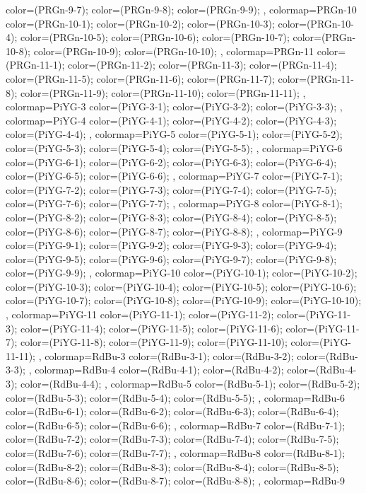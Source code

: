 {{color=(PRGn-9-7);
color=(PRGn-9-8);
color=(PRGn-9-9);
},
colormap={PRGn-10}{
color=(PRGn-10-1);
color=(PRGn-10-2);
color=(PRGn-10-3);
color=(PRGn-10-4);
color=(PRGn-10-5);
color=(PRGn-10-6);
color=(PRGn-10-7);
color=(PRGn-10-8);
color=(PRGn-10-9);
color=(PRGn-10-10);
},
colormap={PRGn-11}{
color=(PRGn-11-1);
color=(PRGn-11-2);
color=(PRGn-11-3);
color=(PRGn-11-4);
color=(PRGn-11-5);
color=(PRGn-11-6);
color=(PRGn-11-7);
color=(PRGn-11-8);
color=(PRGn-11-9);
color=(PRGn-11-10);
color=(PRGn-11-11);
},
colormap={PiYG-3}{
color=(PiYG-3-1);
color=(PiYG-3-2);
color=(PiYG-3-3);
},
colormap={PiYG-4}{
color=(PiYG-4-1);
color=(PiYG-4-2);
color=(PiYG-4-3);
color=(PiYG-4-4);
},
colormap={PiYG-5}{
color=(PiYG-5-1);
color=(PiYG-5-2);
color=(PiYG-5-3);
color=(PiYG-5-4);
color=(PiYG-5-5);
},
colormap={PiYG-6}{
color=(PiYG-6-1);
color=(PiYG-6-2);
color=(PiYG-6-3);
color=(PiYG-6-4);
color=(PiYG-6-5);
color=(PiYG-6-6);
},
colormap={PiYG-7}{
color=(PiYG-7-1);
color=(PiYG-7-2);
color=(PiYG-7-3);
color=(PiYG-7-4);
color=(PiYG-7-5);
color=(PiYG-7-6);
color=(PiYG-7-7);
},
colormap={PiYG-8}{
color=(PiYG-8-1);
color=(PiYG-8-2);
color=(PiYG-8-3);
color=(PiYG-8-4);
color=(PiYG-8-5);
color=(PiYG-8-6);
color=(PiYG-8-7);
color=(PiYG-8-8);
},
colormap={PiYG-9}{
color=(PiYG-9-1);
color=(PiYG-9-2);
color=(PiYG-9-3);
color=(PiYG-9-4);
color=(PiYG-9-5);
color=(PiYG-9-6);
color=(PiYG-9-7);
color=(PiYG-9-8);
color=(PiYG-9-9);
},
colormap={PiYG-10}{
color=(PiYG-10-1);
color=(PiYG-10-2);
color=(PiYG-10-3);
color=(PiYG-10-4);
color=(PiYG-10-5);
color=(PiYG-10-6);
color=(PiYG-10-7);
color=(PiYG-10-8);
color=(PiYG-10-9);
color=(PiYG-10-10);
},
colormap={PiYG-11}{
color=(PiYG-11-1);
color=(PiYG-11-2);
color=(PiYG-11-3);
color=(PiYG-11-4);
color=(PiYG-11-5);
color=(PiYG-11-6);
color=(PiYG-11-7);
color=(PiYG-11-8);
color=(PiYG-11-9);
color=(PiYG-11-10);
color=(PiYG-11-11);
},
colormap={RdBu-3}{
color=(RdBu-3-1);
color=(RdBu-3-2);
color=(RdBu-3-3);
},
colormap={RdBu-4}{
color=(RdBu-4-1);
color=(RdBu-4-2);
color=(RdBu-4-3);
color=(RdBu-4-4);
},
colormap={RdBu-5}{
color=(RdBu-5-1);
color=(RdBu-5-2);
color=(RdBu-5-3);
color=(RdBu-5-4);
color=(RdBu-5-5);
},
colormap={RdBu-6}{
color=(RdBu-6-1);
color=(RdBu-6-2);
color=(RdBu-6-3);
color=(RdBu-6-4);
color=(RdBu-6-5);
color=(RdBu-6-6);
},
colormap={RdBu-7}{
color=(RdBu-7-1);
color=(RdBu-7-2);
color=(RdBu-7-3);
color=(RdBu-7-4);
color=(RdBu-7-5);
color=(RdBu-7-6);
color=(RdBu-7-7);
},
colormap={RdBu-8}{
color=(RdBu-8-1);
color=(RdBu-8-2);
color=(RdBu-8-3);
color=(RdBu-8-4);
color=(RdBu-8-5);
color=(RdBu-8-6);
color=(RdBu-8-7);
color=(RdBu-8-8);
},
colormap={RdBu-9}{
}}
